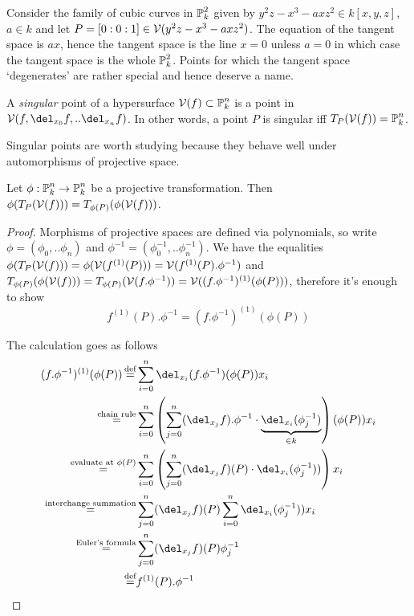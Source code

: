 \begin{example}
Consider the family of cubic curves in $\operatorname{\mathbb P}^2_k$ given by $y^2z - x^3 - axz^2 \in k[x,y,z]$, $a \in k$ and let $P = [0:0:1] \in \operatorname{\mathcal V}(y^2z - x^3 - axz^2)$.
The equation of the tangent space is $ax$, hence the tangent space is the line $x = 0$ unless $a = 0$ in which case the tangent space is the whole $\operatorname{\mathbb P}^2_k$.
Points for which the tangent space `degenerates' are rather special and hence deserve a name.
\end{example}


\begin{definition}
A \emph{singular} point of a hypersurface $\operatorname{\mathcal V}(f) \subset \operatorname{\mathbb P}^n_k$ is a point in $\V(f,\del_{x_0}f,..\del_{x_n}f)$.
In other words, a point $P$ is singular iff $T_P(\operatorname{\mathcal V}(f)) = \operatorname{\mathbb P}^n_k$.
\end{definition}

Singular points are worth studying because they behave well under automorphisms of projective space.

\begin{proposition} \label{propositionTangentTransform}
Let $\phi : \operatorname{\mathbb P}^n_k \to \operatorname{\mathbb P}^n_k$ be a projective transformation.
Then $\phi(T_P(\operatorname{\mathcal V}(f))) = T_{\phi(P)}(\phi(\operatorname{\mathcal V}(f)))$.
\end{proposition}
\begin{proof}
Morphisms of projective spaces are defined via polynomials, so write  $\phi = (\phi_0,..\phi_n)$ and $\phi^{-1} = (\phi^{-1}_0,..\phi^{-1}_n)$.
We have the equalities $\phi(T_P(\operatorname{\mathcal V}(f))) = \phi(\operatorname{\mathcal V}(f^{(1)}(P))) = \operatorname{\mathcal V}(f^{(1)}(P).\phi^{-1})$ and $T_{\phi(P)}(\phi(\operatorname{\mathcal V}(f))) = T_{\phi(P)}(\operatorname{\mathcal V}(f.\phi^{-1})) = \operatorname{\mathcal V}((f.\phi^{-1})^{(1)}(\phi(P)))$, therefore it's enough to show
\begin{equation}
f^{(1)}(P).\phi^{-1} = (f.\phi^{-1})^{(1)}(\phi(P))
\end{equation}

The calculation goes as follows
\begin{align}
(f.\phi^{-1})^{(1)}(\phi(P))
  \defeq& \sum_{i=0}^n \del_{x_i}(f.\phi^{-1})(\phi(P))x_i
\\\overset{\text{chain rule}}=& \sum_{i=0}^n \left(\sum_{j=0}^n (\del_{x_j}f).\phi^{-1} \cdot \underset{\in k}{\underbrace{\del_{x_i}(\phi_j^{-1})}}\right)(\phi(P))x_i
\\\overset{\text{evaluate at }\phi(P)}=& \sum_{i=0}^n \left(\sum_{j=0}^n (\del_{x_j}f)(P) \cdot \del_{x_i}(\phi_j^{-1}))\right)x_i
\\\overset{\text{interchange summation}}=& \sum_{j=0}^n (\del_{x_j}f)(P) \sum_{i=0}^n \del_{x_i}(\phi_j^{-1}))x_i
\\\overset{\text{Euler's formula}}=& \sum_{j=0}^n (\del_{x_j}f)(P) \phi_j^{-1}
\\\defeq& f^{(1)}(P).\phi^{-1}
\end{align}
\end{proof}


